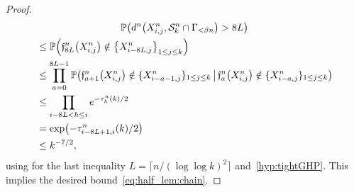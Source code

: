\documentclass[AHL,Unicode,published]{cedram}
\newcommand{\proba}[1]{\mathbb{P}\left(#1\right)}
\newcommand{\1}{\mathbbm{1}}
\newcommand{\fath}{\mathfrak{f}}
\newcommand{\trail}{\mathcal{S}}
\let\originalleft\left
\let\originalright\right
\renewcommand{\left}{\mathopen{}\mathclose\bgroup\originalleft}
\renewcommand{\right}{\aftergroup\egroup\originalright}
\begin{document}
\begin{proof}
\begin{multline*}
\proba{d^n\left(X^n_{i,j},\trail^n_k\cap \Gamma_{<\beta n}\right)>8L}\\
\begin{aligned}
&\leq \proba{\fath^n_{8L}\left(X^n_{i,j}\right)\notin \left\{X^n_{i-8L,j}\right\}_{1\leq j \leq k}}\\
& \le \prod_{a=0}^{8L-1} \proba{\fath^n_{a+1}\left(X^n_{i,j}\right) \notin \{X^n_{i-a-1,j}\}_{1\leq j \leq k} \,\middle|\,\fath^n_{a}\left(X^n_{i,j}\right) \notin \{X^n_{i-a,j}\}_{1\leq j \leq k}}\\
& \leq \prod_{i-8L<h\leq i} e^{-\tau_{h}^n(k)/2}\\
& =\exp \left(-\tau_{i-8L+1,i}^n(k)/2 \right)\\
& \leq k^{-7/2},
\end{aligned}
\end{multline*}
using for the last inequality $L=\lceil n/(\log\log k)^2\rceil$ and~\ref{hyp:tightGHP}. This implies the desired bound~\eqref{eq:half_lem:chain}.
\end{proof}
\end{document}
